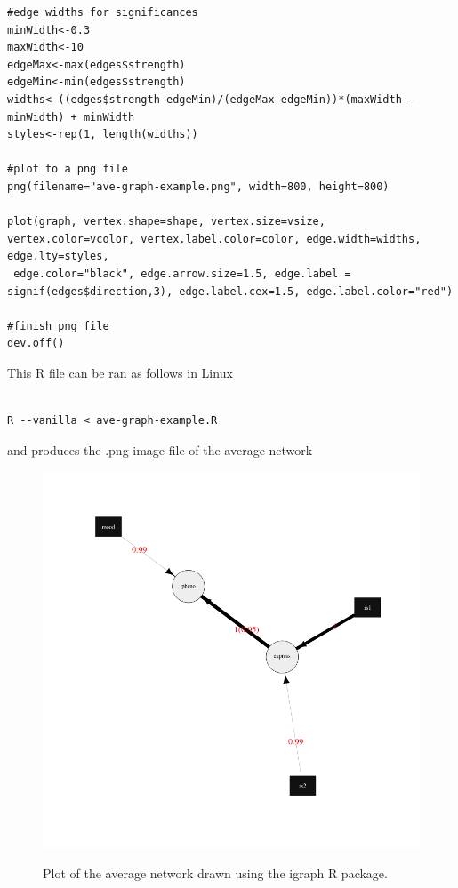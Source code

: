 \documentclass[a4paper,12pt]{article}
\begin{document}
\begin{lstlisting}
#edge widths for significances
minWidth<-0.3
maxWidth<-10
edgeMax<-max(edges$strength)
edgeMin<-min(edges$strength)
widths<-((edges$strength-edgeMin)/(edgeMax-edgeMin))*(maxWidth - minWidth) + minWidth
styles<-rep(1, length(widths))

#plot to a png file
png(filename="ave-graph-example.png", width=800, height=800)

plot(graph, vertex.shape=shape, vertex.size=vsize, vertex.color=vcolor, vertex.label.color=color, edge.width=widths, edge.lty=styles,
 edge.color="black", edge.arrow.size=1.5, edge.label = signif(edges$direction,3), edge.label.cex=1.5, edge.label.color="red")

#finish png file
dev.off()

\end{lstlisting} \vspace{0.35cm}
This R file can be ran as follows in Linux 
\vspace{0.35cm} \begin{lstlisting}

R --vanilla < ave-graph-example.R

\end{lstlisting} \vspace{0.35cm}
and produces the .png image file of the average network 
{\begin{figure}[ht]
{\begin{center}
{\includegraphics[width=400pt]{ave-graph-example.png}}
\caption{Plot of the average network drawn using the igraph R package.}
\label{plot-ave1-fig}
\end{center}}
\end{figure}
}
\end{document}
